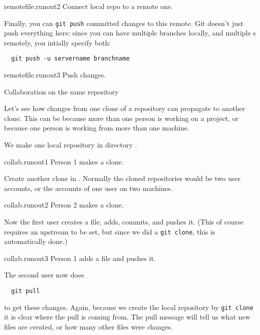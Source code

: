 \begin{gitstep}{remotefile.runout2}
  Connect local repo to a remote one.
\end{gitstep}

Finally, you can \lstinline{git push} committed changes to this remote.
Git doesn't just push everything here: since you can have multiple branches locally,
and multiple s remotely, you intially specify both:
\begin{lstlisting}
  git push -u servername branchname
\end{lstlisting}

\begin{gitstep}{remotefile.runout3}
  Push changes.
\end{gitstep}

 {Collaboration on the same repository}

Let's see how changes from one clone of a repository
can propagate to another clone.
This can be because more than one person is working on a project,
or because one person is working from more than one machine.

We make one local repository in directory .

\begin{gitstep}{collab.runout1}
  Person 1 makes a clone.
\end{gitstep}

Create another clone in .
Normally the cloned repositories would be two user accounts,
or the accounts of one user on two machines.

\begin{gitstep}{collab.runout2}
  Person 2 makes a clone.
\end{gitstep}

Now the first user creates a file, adds, commits, and pushes it.
(This of course requires an upstream to be set,
but since we did a \lstinline{git clone},
this is automatically done.)

\begin{gitstep}{collab.runout3}
  Person 1 adds a file and pushes it.
\end{gitstep}

The second user now does
\begin{lstlisting}
  git pull
\end{lstlisting}
to get these changes.
Again, because we create the local repository by \lstinline{git clone}
it is clear where the pull is coming from.
The pull message will tell us what new files are created,
or how many other files were changes.

